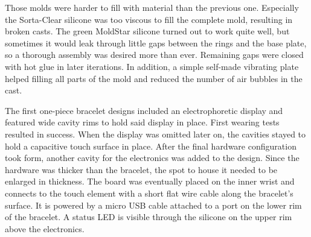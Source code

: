 Those molds were harder to fill with material than the previous one. Especially the Sorta-Clear silicone was too viscous to fill the complete mold, resulting in broken casts. The green MoldStar silicone turned out to work quite well, but sometimes it would leak through little gaps between the rings and the base plate, so a thorough assembly was desired more than ever. Remaining gaps were closed with hot glue in later iterations. In addition, a simple self-made vibrating plate helped filling all parts of the mold and reduced the number of air bubbles in the cast. 

The first one-piece bracelet designs included an electrophoretic display and featured wide cavity rims to hold said display in place. First wearing tests resulted in success. When the display was omitted later on, the cavities stayed to hold a capacitive touch surface in place. After the final hardware configuration took form, another cavity for the electronics was added to the design. Since the hardware was thicker than the bracelet, the spot to house it needed to be enlarged in thickness. The board was eventually placed on the inner wrist and connects to the touch element with a short flat wire cable along the bracelet's surface. It is powered by a micro USB cable attached to a port on the lower rim of the bracelet. A status \ac{LED} is visible through the silicone on the upper rim above the electronics.

